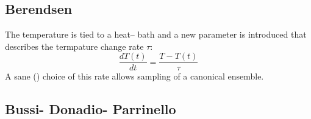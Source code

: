 \subsection{Berendsen}
The temperature is tied to a heat-- bath and a new parameter is introduced that describes the termpature change rate $\tau$:
\begin{equation*}
\frac{dT(t)}{dt} = \frac{T-T(t)}{\tau} %
\end{equation*}
A sane (\TODO) choice of this rate allows sampling of a canonical ensemble.

\subsection{Bussi- Donadio- Parrinello}

